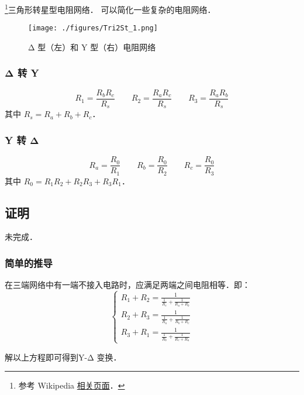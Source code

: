 
\begin{issues}
\issueDraft
\end{issues}

\footnote{参考 Wikipedia \href{https://en.wikipedia.org/wiki/Y-Δ_transform}{相关页面}．}三角形转星型电阻网络． 可以简化一些复杂的电阻网络．

\begin{figure}[ht]
\centering
\texttt{[image: ./figures/Tri2St\_1.png]}
\caption{Δ 型（左）和 Y 型（右）电阻网络} \label{Tri2St_fig1}
\end{figure}

\subsubsection{Δ 转 Y}
\begin{equation}
R_1 = \frac{R_b R_c}{R_s} \qquad
R_2 = \frac{R_a R_c}{R_s} \qquad
R_3 = \frac{R_a R_b}{R_s}
\end{equation}
其中 $R_s = R_a + R_b + R_c$．

\subsubsection{Y 转 Δ}
\begin{equation}
R_a = \frac{R_0}{R_1} \qquad
R_b = \frac{R_0}{R_2} \qquad
R_c = \frac{R_0}{R_3}
\end{equation}
其中 $R_0 = R_1 R_2 + R_2 R_3 + R_3 R_1$．

\subsection{证明}
未完成．
\subsubsection{简单的推导}
在三端网络中有一端不接入电路时，应满足两端之间电阻相等．即：
\begin{equation}
\left\{\begin{matrix}R_1+R_2=\frac{1}{\frac{1}{R_c}+\frac{1}{R_a+R_b}}\\R_2+R_3=\frac{1}{\frac{1}{R_a}+\frac{1}{R_b+R_c}}\\R_3+R_1=\frac{1}{\frac{1}{R_b}+\frac{1}{R_c+R_a}}\end{matrix}\right.
\end{equation}

解以上方程即可得到Y-Δ 变换．
